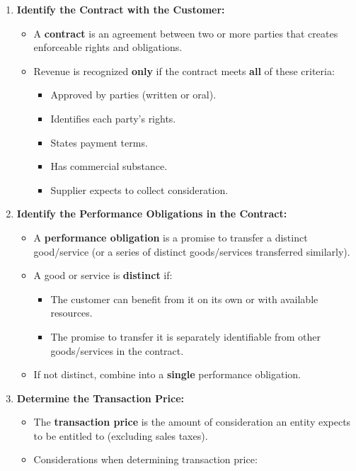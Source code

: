 \begin{enumerate}
    \item \textbf{Identify the Contract with the Customer:}
    \begin{itemize}
        \item A \textbf{contract} is an agreement between two or more parties that creates enforceable rights and obligations.
        \item Revenue is recognized \textbf{only} if the contract meets \textbf{all} of these criteria:
        \begin{itemize}
            \item Approved by parties (written or oral).
            \item Identifies each party's rights.
            \item States payment terms.
            \item Has commercial substance.
            \item Supplier expects to collect consideration.
        \end{itemize}
    \end{itemize}
    \item \textbf{Identify the Performance Obligations in the Contract:}
    \begin{itemize}
        \item A \textbf{performance obligation} is a promise to transfer a distinct good/service (or a series of distinct goods/services transferred similarly).
        \item A good or service is \textbf{distinct} if:
        \begin{itemize}
            \item The customer can benefit from it on its own or with available resources.
            \item The promise to transfer it is separately identifiable from other goods/services in the contract.
        \end{itemize}
        \item If not distinct, combine into a \textbf{single} performance obligation.
    \end{itemize}
    \item \textbf{Determine the Transaction Price:}
    \begin{itemize}
        \item The \textbf{transaction price} is the amount of consideration an entity expects to be entitled to (excluding sales taxes).
        \item Considerations when determining transaction price:

\end{itemize}
\end{enumerate}
